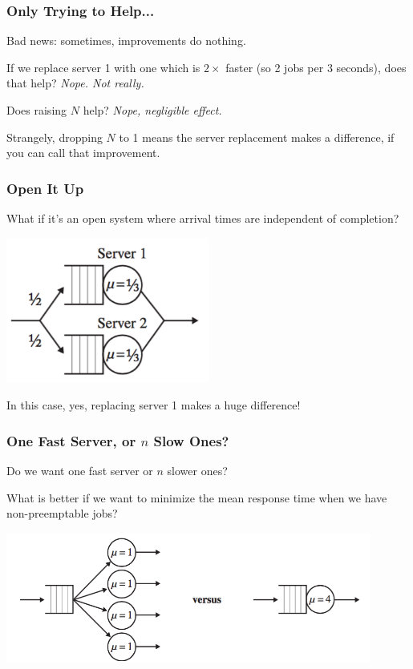 \begin{frame}
\frametitle{Only Trying to Help...}

Bad news: sometimes, improvements do nothing. 

If we replace server 1 with one which is $2\times$ faster (so 2 jobs per 3 seconds), does that help? \emph{Nope. Not really.}

Does raising $N$ help? \emph{Nope, negligible effect.}

Strangely, dropping $N$ to 1 means the server replacement makes a difference, if you can call that improvement.

\end{frame}



\begin{frame}
\frametitle{Open It Up}

What if it's an \alert{open system} where arrival times are independent of completion?

\begin{center}
	\includegraphics[width=0.5\textwidth]{images/qt-example2-2.png}
\end{center}

In this case, yes, replacing server 1 makes a huge difference!

\end{frame}



\begin{frame}
\frametitle{One Fast Server, or $n$ Slow Ones?}

Do we want one fast server or $n$ slower ones? 

What is better if we want to minimize the mean response time when we have non-preemptable jobs?

\begin{center}
	\includegraphics[width=0.9\textwidth]{images/qt-example3.png}
\end{center}

\end{frame}



